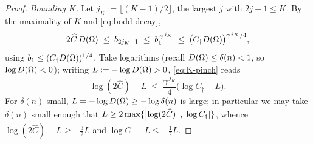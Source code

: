 \begin{proof}
\emph{Bounding $K$.} Let $j_K:=\lfloor(K-1)/2\rfloor$, the largest $j$
with $2j+1\le K$. By the maximality of $K$ and \eqref{eq:bodd-decay},
\begin{equation}\label{eq:K-pinch}
   2\widehat C\,D(\Omega)\;\le\;b_{2j_K+1}\;\le\;b_1^{\,\gamma^{\,j_K}}
   \;\le\;\bigl(C_\dagger D(\Omega)\bigr)^{\gamma^{\,j_K}/4},
\end{equation}
using $b_1\le(C_\dagger D(\Omega))^{1/4}$.
Take logarithms (recall
$D(\Omega)\le\delta(n)<1$, so $\log D(\Omega)<0$); writing $L:=-\log D(\Omega)>0$,
\eqref{eq:K-pinch} reads
\[
   \log(2\widehat C)-L
   \;\le\;\frac{\gamma^{\,j_K}}{4}\bigl(\log C_\dagger-L\bigr).
\]
For $\delta(n)$ small, $L=-\log D(\Omega)\ge-\log\delta(n)$ is large; in
particular we may take $\delta(n)$ small enough that
$L\ge2\max\{\left|\log(2\widehat C)\right|,\left|\log C_\dagger\right|\}$, whence
$\log(2\widehat C)-L\ge-\tfrac32 L$ and $\log C_\dagger-L\le-\tfrac12 L$.

\end{proof}
